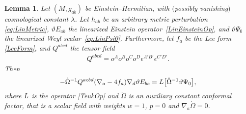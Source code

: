 \documentclass[10pt,a4paper]{amsart}
\numberwithin{equation}{section}
\newtheorem{Lemma}[Theorem]{Lemma}
\begin{document}
\begin{Lemma}\label{lem:OpId}
Let $(M,g_{ab})$ be Einstein--Hermitian, with $($possibly vanishing$)$ cosmological constant $\lambda$. Let $h_{ab}$ be an arbitrary metric perturbation \eqref{eq:LinMetric}, $\vartheta{E}_{ab}$ the linearized Einstein operator~\eqref{LinEinsteinOp}, and $\vartheta\Psi_0$ the linearized Weyl scalar~\eqref{eq:LinPsi0}. Furthermore, let $f_{a}$ be the Lee form \eqref{LeeForm}, and $Q^{abcd}$ the tensor field
\begin{align}\label{tensorQ}
Q^{abcd} = o^{A}o^{B}o^{C}o^{D}\epsilon^{A'B'}\epsilon^{C'D'}.
\end{align}
Then
\begin{align}\label{eq:OpIdentity}
-\mathring{\Omega}^{-1}Q^{acbd}(\nabla_{a}-4f_{a})\nabla_{d}\vartheta E_{bc} = {\rm L}\bigl[\mathring{\Omega}^{-1}\vartheta\Psi_0\bigr],
\end{align}
where ${\rm L}$ is the operator \eqref{TeukOp} and $\mathring{\Omega}$ is an auxiliary constant conformal factor, that is a scalar field with weights $w=1$, $p=0$ and $\nabla_{a}\mathring\Omega=0$.
\end{Lemma}
\end{document}
